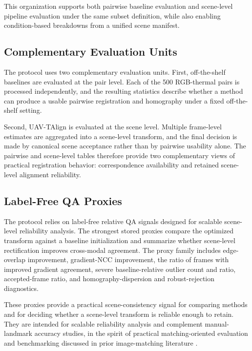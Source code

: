 This organization supports both pairwise baseline evaluation and scene-level pipeline evaluation
under the same subset definition, while also enabling condition-based breakdowns from a unified
scene manifest.

\subsection{Complementary Evaluation Units}

The protocol uses two complementary evaluation units. First, off-the-shelf baselines are evaluated
at the pair level. Each of the 500 RGB-thermal pairs is processed independently, and the resulting
statistics describe whether a method can produce a usable pairwise registration and homography
under a fixed off-the-shelf setting.

Second, UAV-TAlign is evaluated at the scene level. Multiple frame-level estimates are aggregated
into a scene-level transform, and the final decision is made by canonical scene acceptance rather
than by pairwise usability alone. The pairwise and scene-level tables therefore provide two
complementary views of practical registration behavior: correspondence availability and retained
scene-level alignment reliability.

\subsection{Label-Free QA Proxies}

The protocol relies on label-free relative QA signals designed for scalable scene-level reliability
analysis. The strongest stored proxies compare the optimized transform against a baseline
initialization and summarize whether scene-level rectification improves cross-modal agreement. The
proxy family includes edge-overlap improvement, gradient-NCC improvement, the ratio of
frames with improved gradient agreement, severe baseline-relative outlier count and ratio,
accepted-frame ratio, and homography-dispersion and robust-rejection diagnostics.

These proxies provide a practical scene-consistency signal for comparing methods and for deciding
whether a scene-level transform is reliable enough to retain. They are intended for scalable
reliability analysis and complement manual-landmark accuracy studies, in the spirit of practical
matching-oriented evaluation and benchmarking discussed in prior image-matching literature
\cite{ma2021survey,liao2024survey}.
